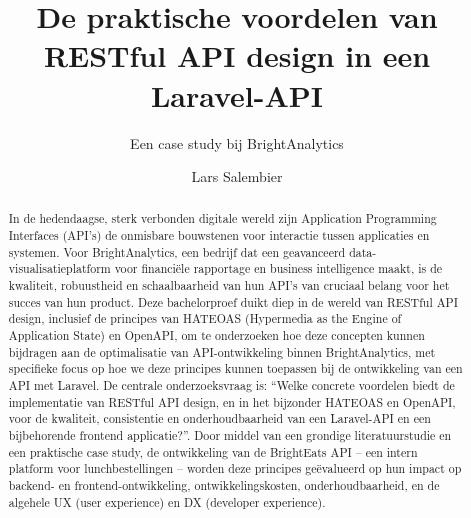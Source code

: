 \documentclass[a0,portrait]{hogent-poster}
\title{De praktische voordelen van RESTful API design in een Laravel-API}
\subtitle{Een case study bij BrightAnalytics}
\author{Lars Salembier}
\begin{document}
\maketitle

\begin{abstract}
In de hedendaagse, sterk verbonden digitale wereld zijn Application Programming Interfaces (API's) de onmisbare bouwstenen voor interactie tussen applicaties en systemen. Voor BrightAnalytics, een bedrijf dat een geavanceerd data-visualisatieplatform voor financiële rapportage en business intelligence maakt, is de kwaliteit, robuustheid en schaalbaarheid van hun API's van cruciaal belang voor het succes van hun product. Deze bachelorproef duikt diep in de wereld van RESTful API design, inclusief de principes van HATEOAS (Hypermedia as the Engine of Application State) en OpenAPI, om te onderzoeken hoe deze concepten kunnen bijdragen aan de optimalisatie van API-ontwikkeling binnen BrightAnalytics, met specifieke focus op hoe we deze principes kunnen toepassen bij de ontwikkeling van een API met Laravel. De centrale onderzoeksvraag is: ``Welke concrete voordelen biedt de implementatie van RESTful API design, en in het bijzonder HATEOAS en OpenAPI, voor de kwaliteit, consistentie en onderhoudbaarheid van een Laravel-API en een bijbehorende frontend applicatie?''. Door middel van een grondige literatuurstudie en een praktische case study, de ontwikkeling van de BrightEats API – een intern platform voor lunchbestellingen – worden deze principes geëvalueerd op hun impact op backend- en frontend-ontwikkeling, ontwikkelingskosten, onderhoudbaarheid, en de algehele UX (user experience) en DX (developer experience).
\end{abstract}
\end{document}
